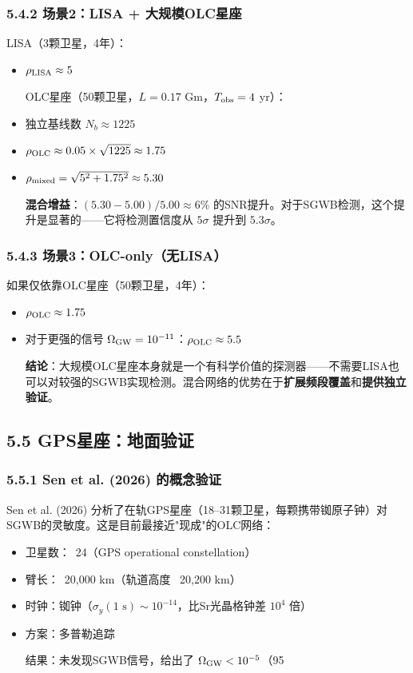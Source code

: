 \documentclass[12pt,a4paper]{article}
\begin{document}
\subsubsection{5.4.2 场景2：LISA + 大规模OLC星座}


LISA（3颗卫星，4年）：
\begin{itemize}
  \item $\rho_{\rm LISA} \approx 5$

OLC星座（50颗卫星，$L = 0.17$ Gm，$T_{\rm obs} = 4$ yr）：
  \item 独立基线数 $N_b \approx 1225$
  \item $\rho_{\rm OLC} \approx 0.05 \times \sqrt{1225} \approx 1.75$
  \item $\rho_{\rm mixed} = \sqrt{5^2 + 1.75^2} \approx 5.30$

\textbf{混合增益}：$(5.30 - 5.00)/5.00 \approx 6\%$ 的SNR提升。对于SGWB检测，这个提升是显著的——它将检测置信度从 $5\sigma$ 提升到 $5.3\sigma$。

\end{itemize}
\subsubsection{5.4.3 场景3：OLC-only（无LISA）}


如果仅依靠OLC星座（50颗卫星，4年）：
\begin{itemize}
  \item $\rho_{\rm OLC} \approx 1.75$
  \item 对于更强的信号 $\Omega_{\rm GW} = 10^{-11}$：$\rho_{\rm OLC} \approx 5.5$

\textbf{结论}：大规模OLC星座本身就是一个有科学价值的探测器——不需要LISA也可以对较强的SGWB实现检测。混合网络的优势在于\textbf{扩展频段覆盖}和\textbf{提供独立验证}。

\end{itemize}
\subsection{5.5 GPS星座：地面验证}


\subsubsection{5.5.1 Sen et al. (2026) 的概念验证}


Sen et al. (2026) 分析了在轨GPS星座（18–31颗卫星，每颗携带铷原子钟）对SGWB的灵敏度\cite{ref5}。这是目前最接近"现成"的OLC网络：

\begin{itemize}
  \item 卫星数：~24（GPS operational constellation）
  \item 臂长：~20,000 km（轨道高度 ~20,200 km）
  \item 时钟：铷钟（$\sigma_y(1\text{ s}) \sim 10^{-14}$，比Sr光晶格钟差 $10^4$ 倍）
  \item 方案：多普勒追踪

结果：未发现SGWB信号，给出了 $\Omega_{\rm GW} < 10^{-5}$（95%

\end{itemize}
\end{document}
